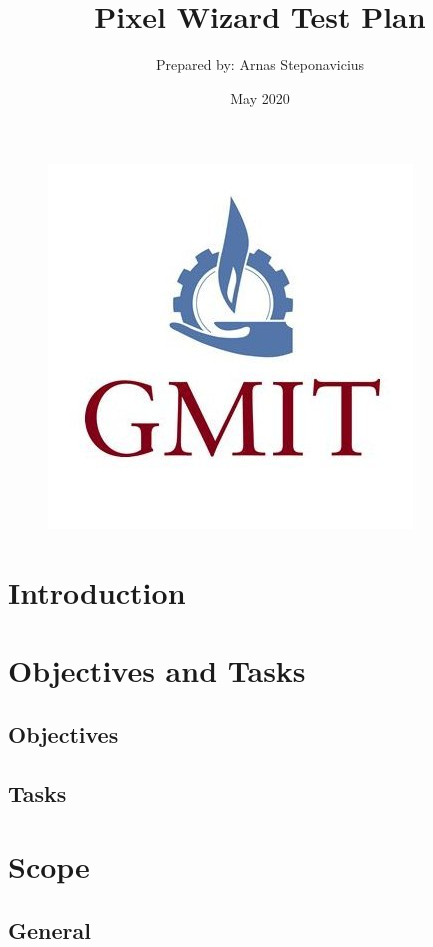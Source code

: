 \documentclass{article}
\begin{document}
\begin{figure}
    \centering
    \includegraphics[scale = 0.25]{images/gmit.jpg}
    \label{fig:gmit}
\end{figure}

\title{Pixel Wizard Test Plan}
\author{Prepared by: Arnas Steponavicius }
\date{May 2020}

\maketitle

\tableofcontents

\section{Introduction}
\newpage

\section{Objectives and Tasks}
    \subsection{Objectives}
    \subsection{Tasks}
\newpage

\section{Scope}
    \subsection{General}
\end{document}

